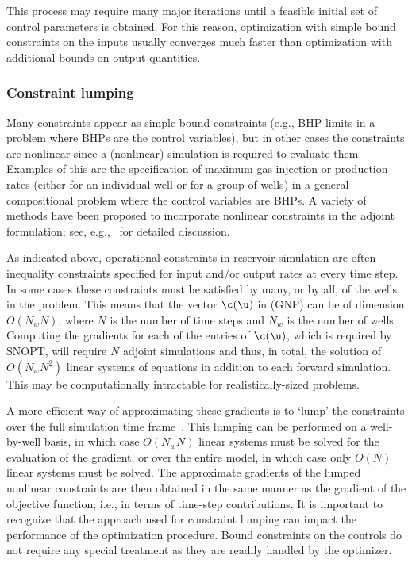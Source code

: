 This process may require many major iterations until a feasible initial set of control parameters
is obtained. For this reason, optimization with simple bound constraints on 
the inputs usually converges much faster than optimization with additional bounds
on output quantities.

\subsubsection{Constraint lumping}

Many constraints appear as simple bound constraints (e.g., BHP limits in a problem where BHPs are the control variables), but in other cases the constraints are nonlinear since a (nonlinear) simulation is required to evaluate them. Examples of this are the specification of maximum 
gas injection or production rates (either for an individual well or for a group of wells) in a 
general compositional problem where the control variables are BHPs. A variety of methods have been proposed to incorporate nonlinear constraints in the adjoint formulation; see,
e.g.,~\cite{Pallav:2006,Jansen:2011,Suwartadi:2012,Chen:2010} for detailed discussion.
 
As indicated above, operational constraints in reservoir simulation are often inequality constraints specified for input and/or output rates at every time step. In some cases these constraints must be satisfied by many, or by all, of the wells in the problem.
This means that the vector $\c(\u)$ in (GNP) can be of dimension $O(N_w N)$, where $N$ is the number of time steps and $N_w$ is the number of wells. Computing the gradients
for each of the entries of $\c(\u)$, which is required by SNOPT, will require $N$ adjoint simulations and thus, in total, the solution of $O(N_w N^2)$ linear systems of equations in addition to each forward simulation. This may be
computationally intractable for realistically-sized problems.

A more efficient way of approximating these gradients 
is to `lump' the constraints over the full simulation time frame~\cite{Pallav:2008}. 
This lumping can be performed on a well-by-well basis, in which case $O(N_w N)$ linear systems 
must be solved for the evaluation of the gradient, or over the entire model, in which case only $O(N)$ linear systems must be solved. The approximate gradients of the lumped
nonlinear constraints are then obtained in the same manner as the gradient of the
objective function; i.e., in terms of time-step contributions. It is important to recognize that the approach used for constraint lumping can impact the performance of the optimization procedure. Bound constraints on the controls do not require any special treatment as they are readily handled by the optimizer.


